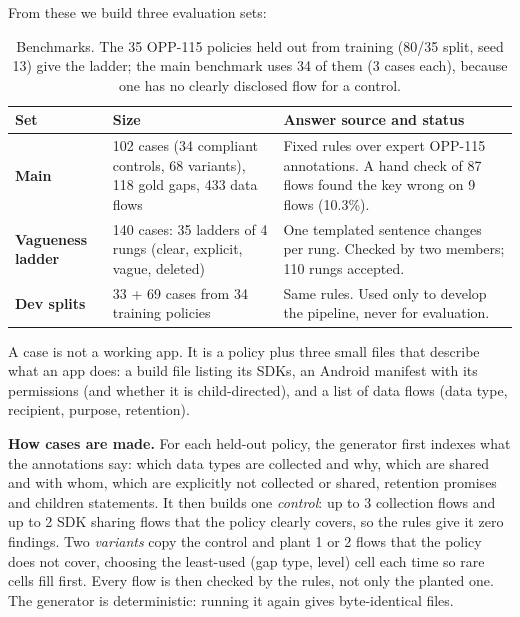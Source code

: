 \documentclass[11pt,a4paper]{article}
\newcommand{\rowline}{\specialrule{0.2pt}{3pt}{3pt}}
\begin{document}
From these we build three evaluation sets:

\begin{table}[H]
\centering
\small
\begin{tabular}{L{2.6cm}L{5.4cm}L{6.2cm}}
\toprule
Set & Size & Answer source and status \\
\midrule
\textbf{Main} & 102 cases (34 compliant controls, 68 variants), 118 gold gaps, 433 data flows &
Fixed rules over expert OPP-115 annotations. A hand check of 87 flows found the key wrong on
9 flows (10.3\%). \\ \rowline
\textbf{Vagueness ladder} & 140 cases: 35 ladders of 4 rungs (clear, explicit, vague, deleted) &
One templated sentence changes per rung. Checked by two members; 110 rungs accepted. \\ \rowline
\textbf{Dev splits} & 33 + 69 cases from 34 training policies & Same rules. Used only to develop
the pipeline, never for evaluation. \\
\bottomrule
\end{tabular}
\caption{Benchmarks. The 35 OPP-115 policies held out from training (80/35 split, seed 13) give the
ladder; the main benchmark uses 34 of them (3 cases each), because one has no clearly disclosed
flow for a control.}
\end{table}

A case is not a working app. It is a policy plus three small files that describe what an app does:
a build file listing its SDKs, an Android manifest with its permissions (and whether it is
child-directed), and a list of data flows (data type, recipient, purpose, retention).

\textbf{How cases are made.} For each held-out policy, the generator first indexes what the
annotations say: which data types are collected and why, which are shared and with whom, which
are explicitly not collected or shared, retention promises and children statements. It then builds
one \emph{control}: up to 3 collection flows and up to 2 SDK sharing flows that the policy clearly
covers, so the rules give it zero findings. Two \emph{variants} copy the control and plant 1 or 2
flows that the policy does not cover, choosing the least-used (gap type, level) cell each time so
rare cells fill first. Every flow is then checked by the rules, not only the planted one. The
generator is deterministic: running it again gives byte-identical files.
\end{document}
